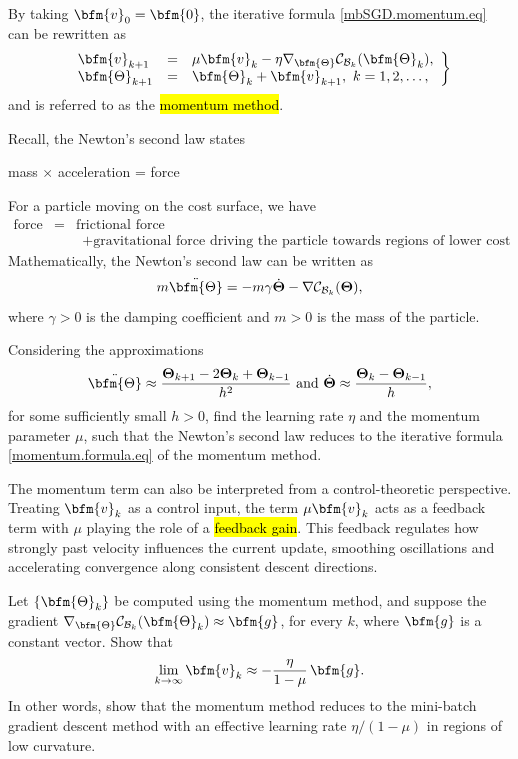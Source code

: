 By taking $\bfm{v}_0=\bfm{0}$, the iterative formula \eqref{mbSGD.momentum.eq} can be rewritten as
\begin{equation}
\left.\begin{array}{lcl}
\bfm{v}_{k+1} &=& \mu \bfm{v}_k - \eta \nabla_{\bfm{\Theta}} \mathcal{C}_{\mathcal{B}_k}(\bfm{\Theta}_k), \\
\bfm{\Theta}_{k+1} &=& \bfm{\Theta}_k + \bfm{v}_{k+1}, ~k=1,2,\ldots,
\end{array}\right\}\label{momentum.formula.eq}
\end{equation}
and is referred to as the \hl{momentum method}.
\begin{problem}
Recall, the Newton's second law states 
\begin{center}
mass $\times$ acceleration = force
\end{center}
For a particle moving on the cost surface, we have
$$\begin{array}{rcl}
\text{force} &=& \text{frictional force}\\
&&~~ + \text{gravitational force driving the particle towards regions of lower cost}
\end{array}$$
Mathematically, the Newton's second law can be written as
$$
m \ddot{\bfm{\Theta}} =
 - m\gamma\dot{\mathbf{\Theta}}  -\nabla \mathcal{C}_{\mathcal{B}_k}(\mathbf{\Theta}),
$$
where $\gamma>0$ is the damping coefficient and $m>0$ is the mass of the particle.

Considering the approximations
$$
\ddot{\bfm{\Theta}} \approx \frac{ \mathbf{\Theta}_{k+1} -2\mathbf{\Theta}_k +\mathbf{\Theta}_{k-1} }{h^2}
~\text{and}~
\dot{\mathbf{\Theta}} \approx \frac{\mathbf{\Theta}_k-\mathbf{\Theta}_{k-1}}{h},
$$
for some sufficiently small $h>0$, find the learning rate $\eta$ and the momentum parameter $\mu$, such that the Newton's second law reduces to the iterative formula \eqref{momentum.formula.eq} of the momentum method.
\end{problem}


The momentum term can also be interpreted from a control-theoretic perspective. 
Treating $\bfm{v}_k$ as a control input, the term $\mu \bfm{v}_k$ acts as a feedback term with $\mu$ playing the role of a \hl{feedback gain}. 
This feedback regulates how strongly past velocity influences the current update, smoothing oscillations and accelerating convergence along consistent descent directions.
\begin{problem}
Let $\{\bfm{\Theta}_k\}$ be computed using the momentum method, and suppose the gradient $\nabla_{\bfm{\Theta}} \mathcal{C}_{\mathcal{B}_k}(\bfm{\Theta}_k) \approx \bfm{g}$, for every $k$, where $\bfm{g}$ is a constant vector. Show that 
$$
\lim_{k\to \infty} \bfm{v}_k \approx -\frac{\eta}{1-\mu}\,\bfm{g}.
$$
In other words, show that the momentum method reduces to the mini-batch gradient descent method with an effective learning rate $\eta/(1-\mu)$ in regions of low curvature.
\end{problem}

